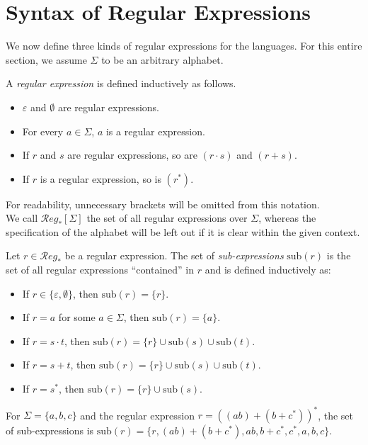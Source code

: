 \section{Syntax of Regular Expressions}
We now define three kinds of regular expressions for the languages. For this entire section, we assume $\Sigma$ to be an arbitrary alphabet.

\begin{defn}
	A \emph{regular expression} is defined inductively as follows.
	\begin{itemize}
		\item $\varepsilon$ and $\emptyset$ are regular expressions.
		\item For every $a \in \Sigma$, $a$ is a regular expression.
		\item If $r$ and $s$ are regular expressions, so are $(r \cdot s)$ and $(r + s)$.
		\item If $r$ is a regular expression, so is $(r^*)$.
	\end{itemize}
	For readability, unnecessary brackets will be omitted from this notation.\\
	We call $\mathcal{R}eg_*[\Sigma]$ the set of all regular expressions over $\Sigma$, whereas the specification of the alphabet will be left out if it is clear within the given context.
\end{defn}

\begin{defn}
	Let $r \in \mathcal{R}eg_*$ be a regular expression. The set of \emph{sub-expressions} $\text{sub}(r)$ is the set of all regular expressions \enquote{contained} in $r$ and is defined inductively as:
	\begin{itemize}
		\item If $r \in \{\varepsilon, \emptyset\}$, then $\text{sub}(r) = \{r\}$.
		\item If $r = a$ for some $a \in \Sigma$, then $\text{sub}(r) = \{a\}$.
		\item If $r = s \cdot t$, then $\text{sub}(r) = \{r\} \cup \text{sub}(s) \cup \text{sub}(t)$.
		\item If $r = s + t$, then $\text{sub}(r) = \{r\} \cup \text{sub}(s) \cup \text{sub}(t)$.
		\item If $r = s^*$, then $\text{sub}(r) = \{r\} \cup \text{sub}(s)$.
	\end{itemize}
\end{defn}

\begin{exmp}
	For $\Sigma = \{a, b, c\}$ and the regular expression $r = ((ab) + (b + c^*))^*$, the set of sub-expressions is $\text{sub}(r) = \{r, (ab) + (b + c^*), ab, b + c^*, c^*, a, b, c\}$.
\end{exmp}

